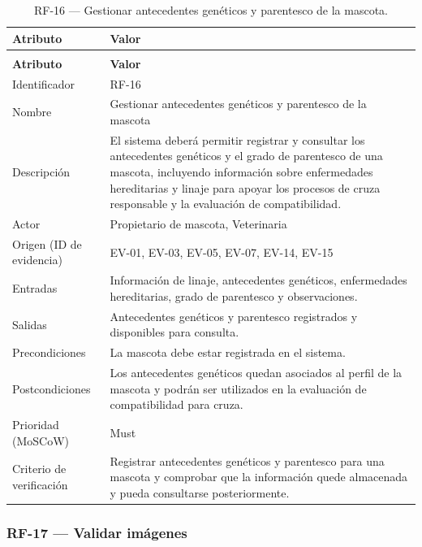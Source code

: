\documentclass[journal,onecolumn]{IEEEtran}
\makeatletter
\newenvironment{atributos}[2]{%
	\small
	\begin{longtable}{@{}>{\raggedright\arraybackslash}p{4.2cm} >{\raggedright\arraybackslash}p{11.2cm}@{}}
		\caption{#2}\label{tab:#1}\\
		\toprule
		\textbf{Atributo} & \textbf{Valor} \\
		\midrule
		\endfirsthead
		\multicolumn{2}{@{}l}{\small\itshape (continuación)}\\
		\toprule
		\textbf{Atributo} & \textbf{Valor} \\
		\midrule
		\endhead
		\bottomrule
		\endlastfoot
	}{%
	\end{longtable}
	\normalsize
}
\makeatother
\begin{document}
	\begin{atributos}{RF-16}{RF-16 --- Gestionar antecedentes genéticos y parentesco de la mascota.}
		Identificador & RF-16 \\
		Nombre & Gestionar antecedentes genéticos y parentesco de la mascota \\
		Descripción & El sistema deberá permitir registrar y consultar los antecedentes genéticos y el grado de parentesco de una mascota, incluyendo información sobre enfermedades hereditarias y linaje para apoyar los procesos de cruza responsable y la evaluación de compatibilidad. \\
		Actor & Propietario de mascota, Veterinaria \\
		Origen (ID de evidencia) & EV-01, EV-03, EV-05, EV-07, EV-14, EV-15 \\
		Entradas & Información de linaje, antecedentes genéticos, enfermedades hereditarias, grado de parentesco y observaciones. \\
		Salidas & Antecedentes genéticos y parentesco registrados y disponibles para consulta. \\
		Precondiciones & La mascota debe estar registrada en el sistema. \\
		Postcondiciones & Los antecedentes genéticos quedan asociados al perfil de la mascota y podrán ser utilizados en la evaluación de compatibilidad para cruza. \\
		Prioridad (MoSCoW) & Must \\
		Criterio de verificación & Registrar antecedentes genéticos y parentesco para una mascota y comprobar que la información quede almacenada y pueda consultarse posteriormente. \\
	\end{atributos}
	
	\subsubsection{RF-17 --- Validar imágenes}
	
\end{document}
